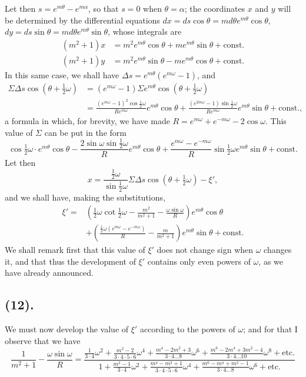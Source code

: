 \documentclass{article}
\begin{document}
Let then $s=e^{m\theta}-e^{m\alpha}$, so that $s=0$ when $\theta=\alpha$; the coordinates $x$ and $y$ will be determined by the differential equations $dx=ds\cos\theta=md\theta e^{m\theta}\cos\theta$, $dy=ds\sin\theta=md\theta e^{m\theta}\sin\theta$, whose integrals are
\[ \begin{aligned} (m^{2}+1)x&=m^{2}e^{m\theta}\cos\theta+me^{m\theta}\sin\theta+\text{const.}\\ (m^{2}+1)y&=m^{2}e^{m\theta}\sin\theta-me^{m\theta}\cos\theta+\text{const.} \end{aligned} \]
In this same case, we shall have $\Delta s=e^{m\theta}(e^{m\omega}-1)$, and
\[ \begin{aligned} \Sigma\Delta s\cos(\theta+\tfrac{1}{2}\omega)&=(e^{m\omega}-1)\Sigma e^{m\theta}\cos(\theta+\tfrac{1}{2}\omega)\\ &=\frac{(e^{m\omega}-1)^{2}\cos\frac{1}{2}\omega}{Re^{m\omega}}e^{m\theta}\cos\theta+\frac{(e^{2m\omega}-1)\sin\frac{1}{2}\omega}{Re^{m\omega}}e^{m\theta}\sin\theta+\text{const.}, \end{aligned} \]
a formula in which, for brevity, we have made $R=e^{m\omega}+e^{-m\omega}-2\cos\omega$. This value of $\Sigma$ can be put in the form
\[ \cos\tfrac{1}{2}\omega\cdot e^{m\theta}\cos\theta-\frac{2\sin\omega\sin\frac{1}{2}\omega}{R}e^{m\theta}\cos\theta+\frac{e^{m\omega}-e^{-m\omega}}{R}\sin\tfrac{1}{2}\omega e^{m\theta}\sin\theta+\text{const.} \]
Let then
\[ x=\frac{\frac{1}{2}\omega}{\sin\frac{1}{2}\omega}\Sigma\Delta s\cos(\theta+\tfrac{1}{2}\omega)-\xi', \]
and we shall have, making the substitutions,
\[ \begin{aligned} \xi'={}&\left(\tfrac{1}{2}\omega\cot\tfrac{1}{2}\omega-\frac{m^{2}}{m^{2}+1}-\frac{\omega\sin\omega}{R}\right)e^{m\theta}\cos\theta\\ &+\left(\frac{\frac{1}{2}\omega(e^{m\omega}-e^{-m\omega})}{R}-\frac{m}{m^{2}+1}\right)e^{m\theta}\sin\theta+\text{const.} \end{aligned} \]
We shall remark first that this value of $\xi'$ does not change sign when $\omega$ changes it, and that thus the development of $\xi'$ contains only even powers of $\omega$, as we have already announced.

\subsection*{(12).}

We must now develop the value of $\xi'$ according to the powers of $\omega$; and for that I observe that we have
\[ \frac{1}{m^{2}+1}-\frac{\omega\sin\omega}{R}=\frac{\frac{1}{3\cdot4}\omega^{2}+\frac{m^{2}-2}{3\cdot4\cdot5\cdot6}\omega^{4}+\frac{m^{4}-2m^{2}+3}{3\cdot4\ldots8}\omega^{6}+\frac{m^{6}-2m^{4}+3m^{2}-4}{3\cdot4\ldots10}\omega^{8}+\text{etc.}}{1+\frac{m^{2}-1}{3\cdot4}\omega^{2}+\frac{m^{4}-m^{2}+1}{3\cdot4\cdot5\cdot6}\omega^{4}+\frac{m^{6}-m^{4}+m^{2}-1}{3\cdot4\ldots8}\omega^{6}+\text{etc.}} \]
\end{document}
